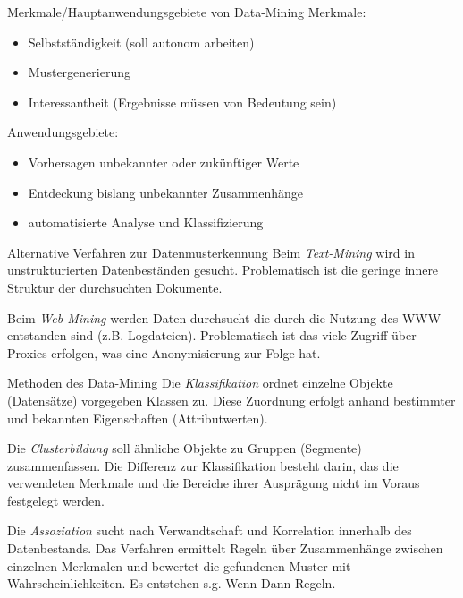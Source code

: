 \documentclass[a6paper,10pt,grid=front%
,toc
]{kartei}
\begin{document}
  \begin{karte}{Merkmale/Hauptanwendungsgebiete von Data-Mining}          
    Merkmale:
    \begin{itemize}
      \item Selbstständigkeit (soll autonom arbeiten)
      \item Mustergenerierung
      \item Interessantheit (Ergebnisse müssen von Bedeutung sein)
    \end{itemize}

    Anwendungsgebiete:
    \begin{itemize}
      \item Vorhersagen unbekannter oder zukünftiger Werte
      \item Entdeckung bislang unbekannter Zusammenhänge
      \item automatisierte Analyse und Klassifizierung
    \end{itemize}
  \end{karte}

  \begin{karte}{Alternative Verfahren zur Datenmusterkennung}
    Beim \textit{Text-Mining} wird in unstrukturierten Datenbeständen gesucht. Problematisch ist die geringe innere Struktur der durchsuchten Dokumente.
    
    Beim \textit{Web-Mining} werden Daten durchsucht die durch die Nutzung des WWW entstanden sind (z.B. Logdateien). Problematisch ist das viele Zugriff über Proxies erfolgen, was eine Anonymisierung zur Folge hat.    
  \end{karte}

  \begin{karte}{Methoden des Data-Mining}  
    Die \textit{Klassifikation} ordnet einzelne Objekte (Datensätze) vorgegeben Klassen zu. Diese Zuordnung erfolgt anhand bestimmter und bekannten Eigenschaften (Attributwerten).

    Die \textit{Clusterbildung} soll ähnliche Objekte zu Gruppen (Segmente) zusammenfassen. Die Differenz zur Klassifikation besteht darin, das die verwendeten Merkmale und die Bereiche ihrer Ausprägung nicht im Voraus festgelegt werden.

    Die \textit{Assoziation} sucht nach Verwandtschaft und Korrelation innerhalb des Datenbestands. Das Verfahren ermittelt Regeln über Zusammenhänge zwischen einzelnen Merkmalen und bewertet die gefundenen Muster mit Wahrscheinlichkeiten. Es entstehen s.g. Wenn-Dann-Regeln.
  \end{karte}
\end{document}

